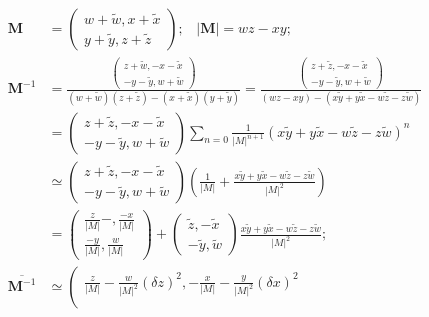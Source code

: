 \documentclass[twoside]{article}
\numberwithin{equation}{section}
\newcommand{\eqspace}{\;\;\;}
\begin{document}
\begin{align*}
\mathbf{M} &= \left( \begin{matrix} w + \tilde{w}, x + \tilde{x} \\ y + \tilde{y}, z + \tilde{z} \end{matrix} \right);
\eqspace |\mathbf{M}| = w z - x y; \\
\mathbf{M}^{-1} &= \frac{\left( \begin{matrix} z + \tilde{w}, - x - \tilde{x} \\ - y -\tilde{y}, w + \tilde{w} \end{matrix} \right)}
			    		 {(w + \tilde{w})(z + \tilde{z}) - (x + \tilde{x})(y + \tilde{y})} 
	= \frac{\left( \begin{matrix} z + \tilde{z}, - x - \tilde{x} \\ - y -\tilde{y}, w + \tilde{w} \end{matrix} \right)}
			    {(w z - x y) - (x \tilde{y} + y \tilde{x} - w \tilde{z} - z \tilde{w})} \\
	&= \left( \begin{matrix} z + \tilde{z}, - x - \tilde{x} \\ - y -\tilde{y}, w + \tilde{w} \end{matrix} \right)
	     \sum_{n=0} \frac{1}{|M|^{n+1}} \left( x \tilde{y} + y \tilde{x} - w \tilde{z} - z \tilde{w} \right)^n \\
	&\simeq \left( \begin{matrix} z + \tilde{z}, - x - \tilde{x} \\ - y -\tilde{y}, w + \tilde{w} \end{matrix} \right)
		\left(\frac{1}{|M|} + \frac{x \tilde{y} + y \tilde{x} - w \tilde{z} - z \tilde{w}}{|M|^2} \right) \\
	& = \left( \begin{matrix} \frac{z}{|M|} - , \frac{-x}{|M|} \\ \frac{-y}{|M|}, \frac{w}{|M|} \end{matrix} \right) 
		+ \left( \begin{matrix} \tilde{z}, -\tilde{x} \\-\tilde{y}, \tilde{w} \end{matrix} \right) 
			\frac{x \tilde{y} + y \tilde{x} - w \tilde{z} - z \tilde{w}}{|M|^2}; \\
\overline{\mathbf{M}^{-1}} &\simeq \left( \begin{matrix} 
			\frac{z}{|M|} - \frac{w}{|M|^2} (\delta z)^2, 
			- \frac{x}{|M|} - \frac{y}{|M|^2} (\delta x)^2 \\ 

\end{matrix}
\end{align*}
\end{document}
